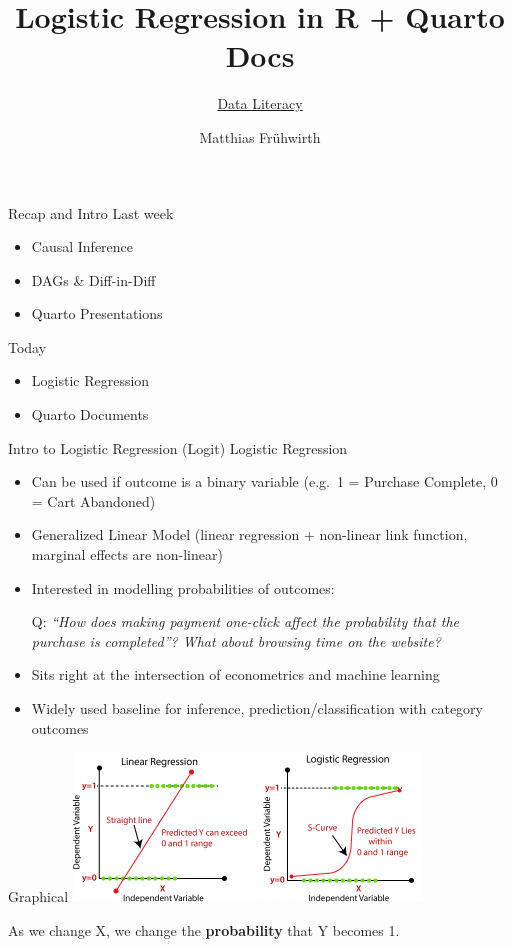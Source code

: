 \documentclass[
  10pt,
  ignorenonframetext,
]{beamer}
\title{Logistic Regression in R + Quarto Docs}
\subtitle{\href{./index.html}{Data Literacy}}
\author{Matthias Frühwirth}
\date{}
\institute{\href{https://www.wu.ac.at/retail/}{Institute for Retailing
\& Data Science}}
\providecommand{\tightlist}{%
  \setlength{\itemsep}{0pt}\setlength{\parskip}{0pt}}\usepackage{longtable,booktabs,array}
\begin{document}
\frame{\titlepage}


\begin{frame}{Recap and Intro}
\label{recap-and-intro}
Last week

\begin{itemize}
\tightlist
\item
  Causal Inference
\item
  DAGs \& Diff-in-Diff
\item
  Quarto Presentations
\end{itemize}

Today

\begin{itemize}
\tightlist
\item
  Logistic Regression
\item
  Quarto Documents
\end{itemize}
\end{frame}

\begin{frame}{Intro to Logistic Regression (Logit)}
\label{intro-to-logistic-regression-logit}
Logistic Regression

\begin{itemize}
\item
  Can be used if outcome is a binary variable (e.g.~1 = Purchase
  Complete, 0 = Cart Abandoned)
\item
  Generalized Linear Model (linear regression + non-linear link
  function, marginal effects are non-linear)
\item
  Interested in modelling probabilities of outcomes:

  Q: \emph{``How does making payment one-click affect the probability
  that the purchase is completed''? What about browsing time on the
  website?}
\item
  Sits right at the intersection of econometrics and machine learning
\item
  Widely used baseline for inference, prediction/classification with
  category outcomes
\end{itemize}
\end{frame}

\begin{frame}{Graphical}
\label{graphical}
\includegraphics[width=3.64583in,height=\textheight]{images/linear-regression-vs-logistic-regression.png}

As we change X, we change the \textbf{probability} that Y becomes 1.
\end{frame}
\end{document}
